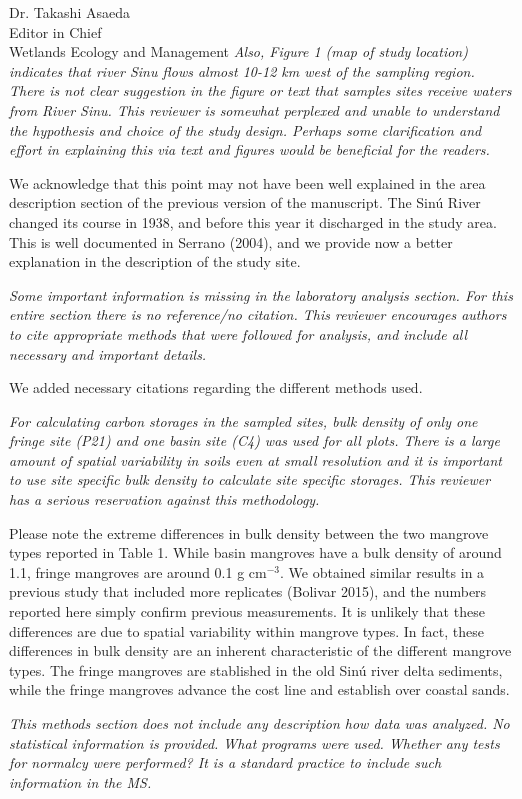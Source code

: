 \documentclass[11pt]{bgcletter}
\begin{document}
\begin{letter}{Dr. Takashi Asaeda\\
 Editor in Chief \\ Wetlands Ecology and Management}
{\it Also, Figure 1 (map of study location) indicates that river Sinu flows almost 10-12 km west of the sampling region. There is not clear suggestion in the figure or text that samples sites receive waters from River Sinu. This reviewer is somewhat perplexed and unable to understand the hypothesis and choice of the study design. Perhaps some clarification and effort in explaining this via text and figures would be beneficial for the readers.}

{\color{blue} We acknowledge that this point may not have been well explained in the area description section of the previous version of the manuscript. The Sin\'u River changed its course in 1938, and before this year it discharged in the study area. This is well documented in Serrano (2004), and we provide now a better explanation in the description of the study site.}

{\it Some important information is missing in the laboratory analysis section. For this entire section there is no reference/no citation. This reviewer encourages authors to cite appropriate methods that were followed for analysis, and include all necessary and important details.}

{\color{blue} We added necessary citations regarding the different methods used.}

{\it For calculating carbon storages in the sampled sites, bulk density of only one fringe site (P21) and one basin site (C4) was used for all plots. There is a large amount of spatial variability in soils even at small resolution and it is important to use site specific bulk density to calculate site specific storages. This reviewer has a serious reservation against this methodology.}

{\color{blue} Please note the extreme differences in bulk density between the two mangrove types reported in Table 1. While basin mangroves have a bulk density of around 1.1, fringe mangroves are around 0.1 g cm$^{-3}$. We obtained similar results in a previous study that included more replicates (Bolivar 2015), and the numbers reported here simply confirm previous measurements. It is unlikely that these differences are due to spatial variability within mangrove types. In fact, these differences in bulk density are an inherent characteristic of the different mangrove types. The fringe mangroves are stablished in the old Sin\'u river delta sediments, while the fringe mangroves advance the cost line and establish over coastal sands. }

{\it This methods section does not include any description how data was analyzed. No statistical information is provided. What programs were used. Whether any tests for normalcy were performed? It is a standard practice to include such information in the MS. }


\end{letter}
\end{document}
